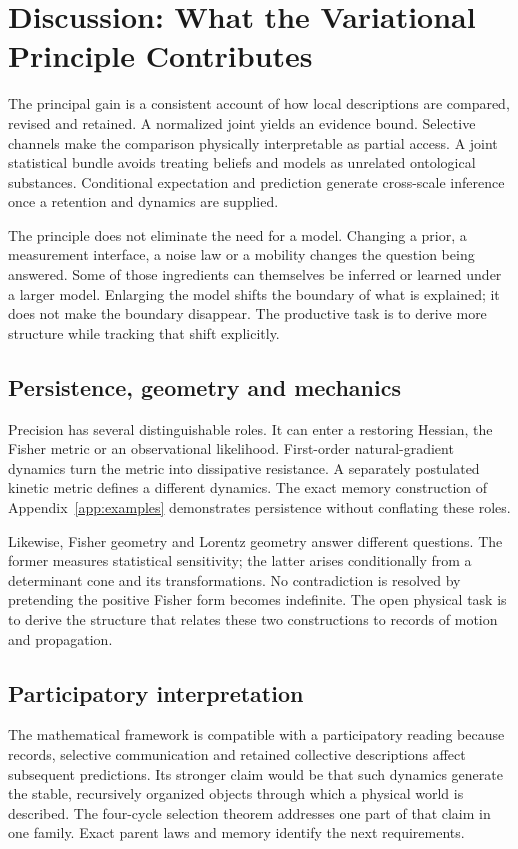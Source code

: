 \section{Discussion: What the Variational Principle Contributes}\label{sec:discussion}

The principal gain is a consistent account of how local descriptions are compared, revised and retained. A normalized joint yields an evidence bound. Selective channels make the comparison physically interpretable as partial access. A joint statistical bundle avoids treating beliefs and models as unrelated ontological substances. Conditional expectation and prediction generate cross-scale inference once a retention and dynamics are supplied.

The principle does not eliminate the need for a model. Changing a prior, a measurement interface, a noise law or a mobility changes the question being answered. Some of those ingredients can themselves be inferred or learned under a larger model. Enlarging the model shifts the boundary of what is explained; it does not make the boundary disappear. The productive task is to derive more structure while tracking that shift explicitly.

\subsection{Persistence, geometry and mechanics}
Precision has several distinguishable roles. It can enter a restoring Hessian, the Fisher metric or an observational likelihood. First-order natural-gradient dynamics turn the metric into dissipative resistance. A separately postulated kinetic metric defines a different dynamics. The exact memory construction of Appendix~\ref{app:examples} demonstrates persistence without conflating these roles.

Likewise, Fisher geometry and Lorentz geometry answer different questions. The former measures statistical sensitivity; the latter arises conditionally from a determinant cone and its transformations. No contradiction is resolved by pretending the positive Fisher form becomes indefinite. The open physical task is to derive the structure that relates these two constructions to records of motion and propagation.

\subsection{Participatory interpretation}
The mathematical framework is compatible with a participatory reading because records, selective communication and retained collective descriptions affect subsequent predictions. Its stronger claim would be that such dynamics generate the stable, recursively organized objects through which a physical world is described. The four-cycle selection theorem addresses one part of that claim in one family. Exact parent laws and memory identify the next requirements.

